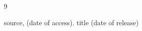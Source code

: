 \begin{thebibliography}{9}

 source, (date of access). title (date of release)

\end{thebibliography}
